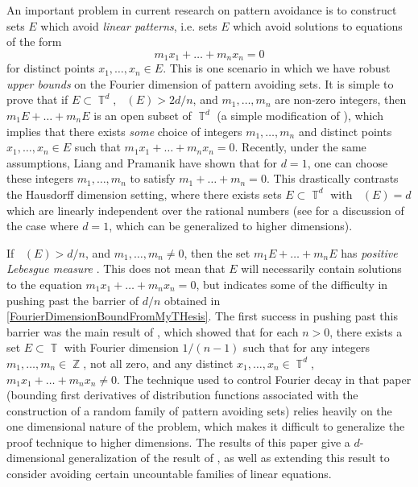 \documentclass[dvipsnames,letterpaper,12pt]{article}
\numberwithin{equation}{section}
\DeclareMathOperator{\hausdim}{\dim_{\mathbb{H}}}
\DeclareMathOperator{\fordim}{\dim_{\mathbb{F}}}
\DeclareMathOperator{\ZZ}{\mathbb{Z}}
\DeclareMathOperator{\TT}{\mathbb{T}}
\numberwithin{theorem}{section}
\begin{document}
An important problem in current research on pattern avoidance is to construct sets $E$ which avoid \emph{linear patterns}, i.e. sets $E$ which avoid solutions to equations of the form
%
\begin{equation}
    m_1x_1 + \dots + m_nx_n = 0
\end{equation}
%
for distinct points $x_1,\dots,x_n \in E$.
%
%
This is one scenario in which we have robust \emph{upper bounds} on the Fourier dimension of pattern avoiding sets. It is simple to prove that if $E \subset \TT^d$, $\fordim(E) > 2d/n$, and $m_1,\dots,m_n$ are non-zero integers, then $m_1 E + \dots + m_n E$ is an open subset of $\TT^d$ (a simple modification of \cite[Proposition 3.14]{MattilaFourier}), which implies that there exists \emph{some} choice of integers $m_1,\dots,m_n$ and distinct points $x_1,\dots,x_n \in E$ such that $m_1x_1 + \dots + m_nx_n = 0$. Recently, under the same assumptions, Liang and Pramanik have shown \cite{LiangPramanik} that for $d = 1$, one can choose these integers $m_1,\dots,m_n$ to satisfy $m_1 + \dots + m_n = 0$. This drastically contrasts the Hausdorff dimension setting, where there exists sets $E \subset \TT^d$ with $\hausdim(E) = d$ which are linearly independent over the rational numbers (see \cite{Keleti} for a discussion of the case where $d = 1$, which can be generalized to higher dimensions).

If $\fordim(E) > d/n$, and $m_1,\dots,m_n \neq 0$, then the set $m_1 E + \dots + m_n E$ has \emph{positive Lebesgue measure} \cite[Proposition 3.14]{MattilaFourier}. This does not mean that $E$ will necessarily contain solutions to the equation $m_1x_1 + \dots + m_nx_n = 0$, but indicates some of the difficulty in pushing past the barrier of $d/n$ obtained in \eqref{FourierDimensionBoundFromMyTHesis}. The first success in pushing past this barrier was the main result of \cite{Korner2}, which showed that for each $n > 0$, there exists a set $E \subset \TT$ with Fourier dimension $1/(n-1)$ such that for any integers $m_1,\dots,m_n \in \ZZ$, not all zero, and any distinct $x_1,\dots,x_n \in \TT^d$, $m_1x_1 + \dots + m_nx_n \neq 0$. The technique used to control Fourier decay in that paper (bounding first derivatives of distribution functions associated with the construction of a random family of pattern avoiding sets) relies heavily on the one dimensional nature of the problem, which makes it difficult to generalize the proof technique to higher dimensions. The results of this paper give a $d$-dimensional generalization of the result of \cite{Korner2}, as well as extending this result to consider avoiding certain uncountable families of linear equations.
\end{document}
